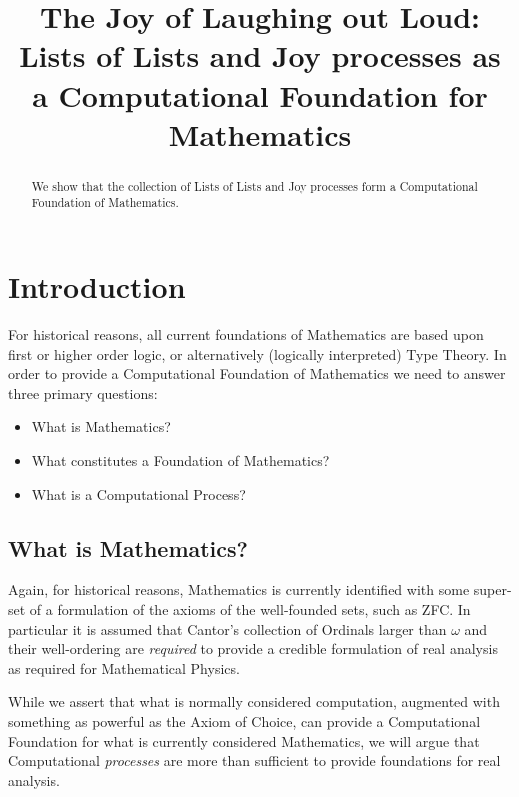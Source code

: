 \documentclass[a4paper,openany]{amsart}
\begin{document}
	
\sloppy
	
\title[Joy of LoL]{The Joy of Laughing out Loud: Lists of Lists and Joy
processes as a Computational Foundation for Mathematics}
 
%
	
\begin{abstract}
We show that the collection of Lists of Lists and Joy processes form a
Computational Foundation of Mathematics.
\end{abstract} 
\maketitle 
\tableofcontents 
	
	
\section{Introduction} For historical reasons, all current foundations of
Mathematics are based upon first or higher order logic, or alternatively
(logically interpreted) Type Theory.  In order
to provide a Computational Foundation of Mathematics we need to answer three
primary questions:

\begin{itemize}
\item What is Mathematics?
\item What constitutes a Foundation of Mathematics?
\item What is a Computational Process?
\end{itemize}

\subsection{What is Mathematics?}

Again, for historical reasons, Mathematics is currently identified with some
super-set of a formulation of the axioms of the well-founded sets, such as ZFC.
In particular it is assumed that Cantor's collection of Ordinals larger than
$\omega$ and their well-ordering are \emph{required} to provide a credible
formulation of real analysis as required for Mathematical Physics.

While we assert that what is normally considered computation, augmented with
something as powerful as the Axiom of Choice, can provide a Computational
Foundation for what is currently considered Mathematics, we will argue that
Computational \emph{processes} are more than sufficient to provide foundations
for real analysis. 
\end{document}
